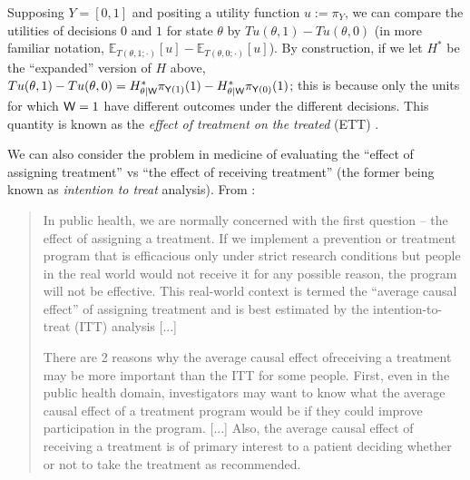 Supposing $Y=[0,1]$ and positing a utility function $u:=\pi_{Y}$, we can compare the utilities of decisions $0$ and $1$ for state $\theta$ by $Tu(\theta,1)-Tu(\theta,0)$ (in more familiar notation, $\mathbb{E}_{T(\theta,1;\cdot)}[u] - \mathbb{E}_{T(\theta,0;\cdot)}[u]$). By construction, if we let $H^*$ be the ``expanded'' version of $H$ above, $Tu(\theta,1)-Tu(\theta,0)=H^*_{\theta|\mathsf{W}}\pi_{\mathsf{Y}(1)}(1) - H^*_{\theta|\mathsf{W}}\pi_{\mathsf{Y}(0)}(1)$; this is because only the units for which $\mathsf{W}=1$ have different outcomes under the different decisions. This quantity is known as the \emph{effect of treatment on the treated} (ETT) \citep{heckman_randomization_1991}. 


We can also consider the problem in medicine of evaluating the ``effect of assigning treatment'' vs ``the effect of receiving treatment'' (the former being known as \emph{intention to treat} analysis). From \citet{shrier_intention--treat_2017}:

\begin{quote}
In public health, we are normally concerned with the first question -- the effect of assigning a treatment. If we implement a prevention or treatment program that is efficacious only under strict research conditions but people in the real world would not receive it for any possible reason, the program will not be effective. This real-world context is termed the “average causal effect” of assigning treatment and is best estimated by the intention-to-treat (ITT) analysis [...]

There are 2 reasons why the average causal effect ofreceiving a treatment may be more important than the ITT for some people. First, even in the public health domain, investigators may want to know what the average causal effect of a treatment program would be if they could improve participation in the program. [...] Also, the average causal effect of receiving a treatment is of primary interest to a patient deciding whether or not to take the treatment as recommended.
\end{quote}

